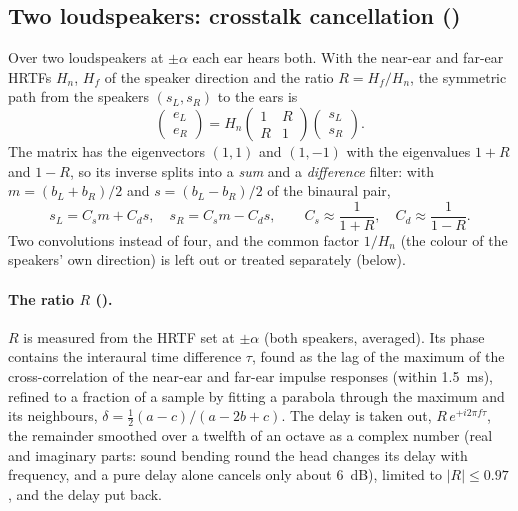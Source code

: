 \subsection{Two loudspeakers: crosstalk cancellation ()}
\label{sec:math-transaural}
Over two loudspeakers at $\pm\alpha$ each ear hears both. With the near-ear and far-ear HRTFs $H_n$, $H_f$ of the
speaker direction and the ratio $R = H_f/H_n$, the symmetric path from the speakers $(s_L, s_R)$ to the ears is
\begin{equation}
  \begin{pmatrix} e_L \\ e_R \end{pmatrix} = H_n \begin{pmatrix} 1 & R \\ R & 1 \end{pmatrix}
  \begin{pmatrix} s_L \\ s_R \end{pmatrix}.
\end{equation}
The matrix has the eigenvectors $(1,1)$ and $(1,-1)$ with the eigenvalues $1+R$ and $1-R$, so its inverse splits into a
\emph{sum} and a \emph{difference} filter: with $m = (b_L+b_R)/2$ and $s = (b_L-b_R)/2$ of the binaural pair,
\begin{equation}
  s_L = C_s m + C_d s,\quad s_R = C_s m - C_d s,\qquad C_s \approx \frac{1}{1+R},\quad C_d \approx \frac{1}{1-R}.
\end{equation}
Two convolutions instead of four, and the common factor $1/H_n$ (the colour of the speakers' own direction) is left out
or treated separately (below).

\paragraph{The ratio $R$ ().} $R$ is measured from the HRTF set at $\pm\alpha$ (both
speakers, averaged). Its phase contains the interaural time difference $\tau$, found as the lag of the maximum of the
cross-correlation of the near-ear and far-ear impulse responses (within \SI{1.5}{ms}), refined to a fraction of a
sample by fitting a parabola through the maximum and its neighbours,
$\delta = \tfrac12(a-c)/(a-2b+c)$. The delay is taken out, $R\,e^{+i2\pi f\tau}$, the remainder smoothed over a twelfth
of an octave as a complex number (real and imaginary parts: sound bending round the head changes its delay with
frequency, and a pure delay alone cancels only about \SI{6}{dB}), limited to $|R|\le0.97$, and the delay put back.

